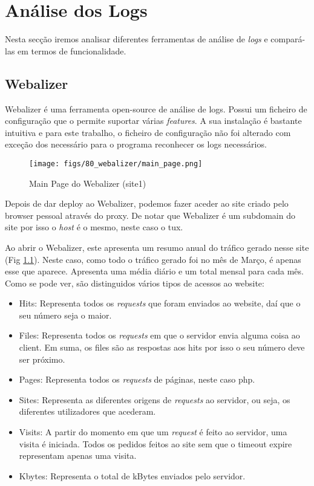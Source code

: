 \chapter{Análise dos Logs}
Nesta secção iremos analisar diferentes ferramentas de análise de \textit{logs} e compará-las em termos de funcionalidade.

\section{Webalizer}
Webalizer é uma ferramenta open-source de análise de logs. Possui um ficheiro de configuração que o permite suportar várias \textit{features}.
A sua instalação é bastante intuitiva e para este trabalho, o ficheiro de configuração não foi alterado com exceção dos necessário para
o programa reconhecer os logs necessários.

\begin{figure}
    \centering
    \texttt{[image: figs/80\_webalizer/main\_page.png]}
    \caption{Main Page do Webalizer (site1)}
    \label{fig:main_webalizer}
\end{figure}

Depois de dar deploy ao Webalizer, podemos fazer aceder ao site criado pelo browser pessoal através do proxy.
De notar que Webalizer é um subdomain do site por isso o \textit{host} é o mesmo, neste caso o tux.

Ao abrir o Webalizer, este apresenta um resumo anual do tráfico gerado nesse site (Fig \ref{fig:main_webalizer}). Neste caso, como todo o tráfico
gerado foi no mês de Março, é apenas esse que aparece. Apresenta uma média diário e um total mensal para cada mês.
Como se pode ver, são distinguidos vários tipos de acessos ao website:

\begin{itemize}
    \item Hits: Representa todos os \textit{requests} que foram enviados ao website, daí que o seu número seja o maior.
    \item Files: Representa todos os \textit{requests} em que o servidor envia alguma coisa ao client. Em suma, os files são as respostas aos hits por isso o seu número deve ser próximo.
    \item Pages: Representa todos os \textit{requests} de páginas, neste caso php.
    \item Sites: Representa as diferentes origens de \textit{requests} ao servidor, ou seja, os diferentes utilizadores que acederam.
    \item Visits: A partir do momento em que um \textit{request} é feito ao servidor, uma visita é iniciada. Todos os pedidos feitos ao site sem que o timeout expire representam apenas uma visita.
    \item Kbytes: Representa o total de kBytes enviados pelo servidor.
\end{itemize}

